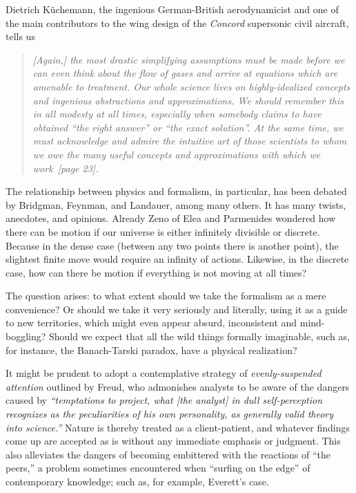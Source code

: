 Dietrich K\"uchemann,
the ingenious German-British aerodynamicist and
one of the main contributors to the wing design of the {\em Concord} supersonic civil aircraft, tells us
\cite[5mm]{Kuchemann}
\begin{quote}
{\em
[Again,] the most drastic simplifying assumptions must be made before we can even think about
the flow of gases and arrive at equations which are amenable to treatment. Our whole
science lives on highly-idealized concepts and ingenious abstractions and approximations.
We should remember this in all modesty at all times, especially when somebody claims to
have obtained ``the right answer'' or ``the exact solution''.
At the same time, we must acknowledge and admire the intuitive art of those scientists
to whom we owe the many useful concepts and approximations with which we work~[page 23].
}
\end{quote}




{The relationship between physics and formalism}, in particular, has been debated by
Bridgman\cite[-30mm]{bridgman},
Feynman\cite[-15mm]{feynman-computation},
and  Landauer\cite{landauer},
among many others.
It has many twists, anecdotes, and opinions.
Already Zeno of Elea and Parmenides wondered how there can be motion if
our universe is either infinitely divisible or discrete.
Because in the dense case (between any two points there is another point),
the slightest finite move would require an infinity of actions.
Likewise, in the discrete case,
how can there be motion if everything is not moving at all times\cite[-10mm]{zeno}?


{The question arises:} to what extent should we take the formalism as a mere convenience?
Or should we take it very seriously and literally,
using it as a guide to new territories, which might even appear absurd, inconsistent and mind-boggling?
Should we expect that all the wild things
formally imaginable,  such as, for instance, the Banach-Tarski paradox\cite[-30mm]{wagon1},  have a physical realization?


{It might be prudent} to
adopt a contemplative strategy of {\em evenly-suspended attention}
outlined by  Freud\cite[-15mm]{Freud-1912}, who admonishes analysts to be aware of the dangers
caused by {\em ``temptations to project,
what  [the analyst]  in dull self-perception recognizes as the peculiarities of his own personality,
as generally valid theory into science.''}
Nature is thereby treated as a  client-patient,  and whatever findings come up are accepted  as is  without any
immediate emphasis or judgment.
This also alleviates the dangers of becoming embittered with the reactions of ``the peers,''
a problem sometimes encountered when ``surfing on the edge'' of contemporary knowledge; such as, for
example, Everett's case\cite[-15mm]{everett-collw}.

